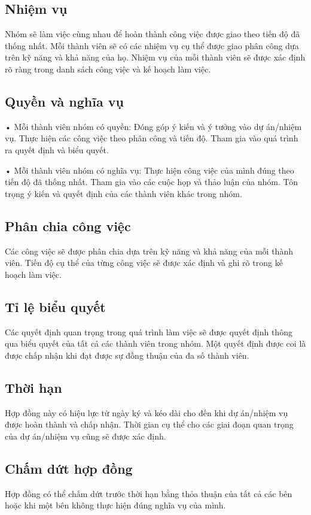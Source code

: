 \documentclass[article]{llncs}
\begin{document}
\subsection{Nhiệm vụ}

Nhóm sẽ làm việc cùng nhau để hoàn thành công việc được giao theo tiến độ đã thống nhất.
Mỗi thành viên sẽ có các nhiệm vụ cụ thể được giao phân công dựa trên kỹ năng và khả năng của họ.
Nhiệm vụ của mỗi thành viên sẽ được xác định rõ ràng trong danh sách công việc và kế hoạch làm việc.

\subsection{Quyền và nghĩa vụ}
•	Mỗi thành viên nhóm có quyền:
Đóng góp ý kiến và ý tưởng vào dự án/nhiệm vụ.
Thực hiện các công việc theo phân công và tiến độ.
Tham gia vào quá trình ra quyết định và biểu quyết.

•	Mỗi thành viên nhóm có nghĩa vụ:
Thực hiện công việc của mình đúng theo tiến độ đã thống nhất.
Tham gia vào các cuộc họp và thảo luận của nhóm.
Tôn trọng ý kiến và quyết định của các thành viên khác trong nhóm.

\subsection{Phân chia công việc}
Các công việc sẽ được phân chia dựa trên kỹ năng và khả năng của mỗi thành viên.
Tiến độ cụ thể của từng công việc sẽ được xác định và ghi rõ trong kế hoạch làm việc.

\subsection{Tỉ lệ biểu quyết}
Các quyết định quan trọng trong quá trình làm việc sẽ được quyết định thông qua biểu quyết của tất cả các thành viên trong nhóm. Một quyết định được coi là được chấp nhận khi đạt được sự đồng thuận của đa số thành viên.

\subsection{Thời hạn}
Hợp đồng này có hiệu lực từ ngày ký và kéo dài cho đến khi dự án/nhiệm vụ được hoàn thành và chấp nhận.
Thời gian cụ thể cho các giai đoạn quan trọng của dự án/nhiệm vụ cũng sẽ được xác định.

\subsection{Chấm dứt hợp đồng}
Hợp đồng có thể chấm dứt trước thời hạn bằng thỏa thuận của tất cả các bên hoặc khi một bên không thực hiện đúng nghĩa vụ của mình.
\end{document}
